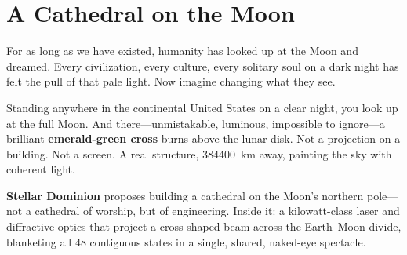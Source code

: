 \documentclass[10pt,letterpaper]{article}
\begin{document}
\newpage
\begin{abstract}
\noindent
Stellar Dominion integrates a \SI{3}{\kilo\watt}--\SI{5}{\kilo\watt}
emerald-green fiber laser directly into a SpaceX Starship HLS that lands
permanently on the lunar north pole. The Starship becomes the operational base:
its \SI{50}{\meter} stainless steel hull provides structure, thermal mass, and
mounting area for SolAero IMM-\(\alpha\) solar panels. A deployable boom
extends the laser, telescope, and diffractive optical element from the top of
the vehicle, pointing horizontally toward Earth. The cross fires every Sunday
when the Moon is visible at night over the US, with aspirational first light on
Easter Sunday, April~1, 2027. Total system mass is \SI{1.4}{\tonne}---a 39\%
reduction over a standalone pallet design. Core project cost is
\$42--114 million (projector, energy system, Starship modifications, and
ground systems), with a Starship lunar cargo flight adding \$20--50 million
if purchased separately. Total lifecycle cost including launch and ten years
of operations is \$72--192 million.
\end{abstract}

\tableofcontents
\listoftables
\listoffigures
\twocolumn

\section{A Cathedral on the Moon}

For as long as we have existed, humanity has looked up at the Moon and dreamed.
Every civilization, every culture, every solitary soul on a dark night has felt
the pull of that pale light. Now imagine changing what they see.

Standing anywhere in the continental United States on a clear night, you look
up at the full Moon. And there---unmistakable, luminous, impossible to
ignore---a brilliant \textbf{\color{emerald}emerald-green cross} burns above
the lunar disk. Not a projection on a building. Not a screen. A real structure,
\SI{384400}{\kilo\meter} away, painting the sky with coherent light.

\textbf{Stellar Dominion} proposes building a cathedral on the Moon's northern
pole---not a cathedral of worship, but of engineering. Inside it: a
kilowatt-class laser and diffractive optics that project a cross-shaped beam
across the Earth--Moon divide, blanketing all 48 contiguous states in a single,
shared, naked-eye spectacle.
\end{document}
